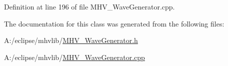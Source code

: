 \-Definition at line 196 of file \-M\-H\-V\-\_\-\-Wave\-Generator.\-cpp.



\-The documentation for this class was generated from the following files\-:\begin{DoxyCompactItemize}
\item 
\-A\-:/eclipse/mhvlib/\hyperlink{_m_h_v___wave_generator_8h}{\-M\-H\-V\-\_\-\-Wave\-Generator.\-h}\item 
\-A\-:/eclipse/mhvlib/\hyperlink{_m_h_v___wave_generator_8cpp}{\-M\-H\-V\-\_\-\-Wave\-Generator.\-cpp}\end{DoxyCompactItemize}
